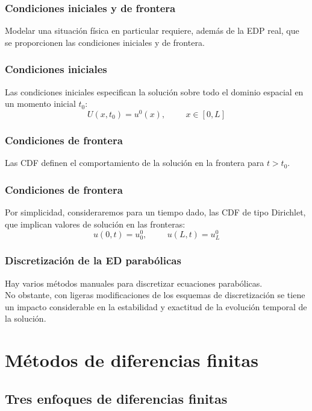 \documentclass[12pt]{beamer}
\begin{document}
\begin{frame}
\frametitle{Condiciones iniciales y de frontera}
Modelar una situación física en particular requiere, además de la EDP real, que se proporcionen las condiciones iniciales y de frontera.
\end{frame}
\begin{frame}
\frametitle{Condiciones iniciales}
Las condiciones iniciales especifican la solución sobre todo el dominio espacial en un momento inicial $t_{0}$:
\begin{equation}
U(x, t_{0}) = u^{0} (x), \hspace{1cm} x \in [0, L]
\label{eq:ecuacion_13_38}
\end{equation}
\end{frame}
\begin{frame}
\frametitle{Condiciones de frontera}
Las CDF definen el comportamiento de la solución en la frontera para $t > t_{0}$.
\end{frame}
\begin{frame}
\frametitle{Condiciones de frontera}
Por simplicidad, consideraremos para un tiempo dado, las CDF de tipo Dirichlet, que implican valores de solución en las fronteras:
\begin{equation}
u (0, t) = u_{0}^{0}, \hspace{1cm} u (L, t) = u_{L}^{0}
\label{eq:ecuacion_13_39}
\end{equation}
\end{frame}
\begin{frame}
\frametitle{Discretización de la ED parabólicas}
Hay varios métodos manuales para discretizar ecuaciones parabólicas.
\\
\bigskip
\pause
No obstante, con ligeras modificaciones de los esquemas de discretización se tiene un impacto considerable en la estabilidad y exactitud de la evolución temporal de la solución.
\end{frame}

\section{Métodos de diferencias finitas}
\subsection{Tres enfoques de diferencias finitas}
\end{document}
